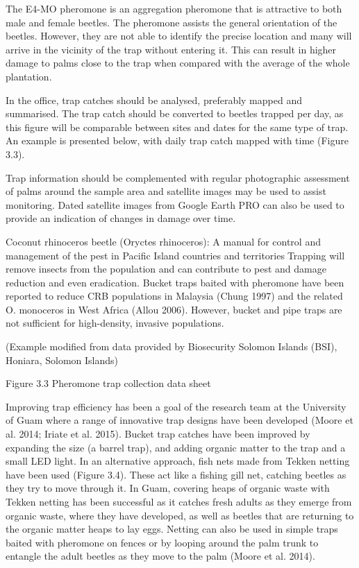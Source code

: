\documentclass[twocolumn,letterpaper]{scrartcl}
\begin{document}
The E4-MO pheromone is an aggregation pheromone that is attractive to both male and female beetles. The 
pheromone assists the general orientation of the beetles. However, they are not able to identify the precise 
location and many will arrive in the vicinity of the trap without entering it. This can result in higher damage to 
palms close to the trap when compared with the average of the whole plantation.

In the office, trap catches should be analysed, preferably mapped and summarised. The trap catch should be 
converted to beetles trapped per day, as this figure will be comparable between sites and dates for the same 
type of trap. An example is presented below, with daily trap catch mapped with time (Figure 3.3). 

Trap information should be complemented with regular photographic assessment of palms around the sample 
area and satellite images may be used to assist monitoring. Dated satellite images from Google Earth PRO can 
also be used to provide an indication of changes in damage over time.

Coconut rhinoceros beetle (Oryctes rhinoceros): A manual for control and management of the pest in Pacific Island countries and territoriesTrapping will remove insects from the population and can contribute to pest and damage reduction and even 
eradication. Bucket traps baited with pheromone have been reported to reduce CRB populations in Malaysia 
(Chung 1997) and the related O. monoceros in West Africa (Allou 2006). However, bucket and pipe traps are not 
sufficient for high-density, invasive populations. 

(Example modified from data provided by Biosecurity Solomon Islands (BSI), Honiara, Solomon Islands) 

Figure 3.3  Pheromone trap collection data sheet  

Improving trap efficiency has been a goal of the research team at the University of Guam where a range of 
innovative trap designs have been developed (Moore et al. 2014; Iriate et al. 2015). Bucket trap catches have 
been improved by expanding the size (a barrel trap), and adding organic matter to the trap and a small LED 
light. In an alternative approach, fish nets made from Tekken netting have been used (Figure 3.4). These act like 
a fishing gill net, catching beetles as they try to move through it. In Guam, covering heaps of organic waste with 
Tekken netting has been successful as it catches fresh adults as they emerge from organic waste, where they 
have developed, as well as beetles that are returning to the organic matter heaps to lay eggs. Netting can also 
be used in simple traps baited with pheromone on fences or by looping around the palm trunk to entangle the 
adult beetles as they move to the palm (Moore et al. 2014).  
\end{document}
